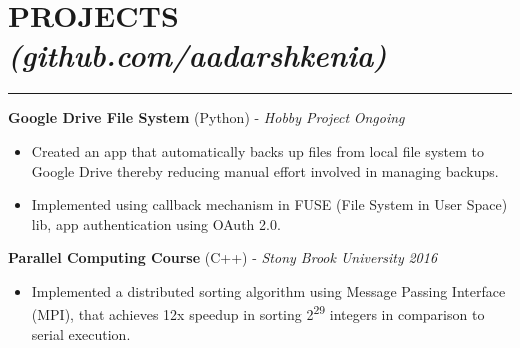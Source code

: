 \documentclass[12pt]{article}
\newcommand{\sectionHeadingWithLink}[2]{
\vspace{-15pt}
\section*{\small{#1 \textit{#2}}}
\vspace{-10pt}
\hrule
\vspace{6pt}
}
\newcommand {\projectSectionSubheadingAlternate}[4]{
    \noindent \small{\textbf{#1} (#3) - \textit{#2} \hfill \textit{#4}} \\
    \vspace{-22pt}
}
\newcommand{\sectionListStart}{
    \begin{itemize}[label={\small{\textbullet}}, leftmargin=20pt] %
}
\newcommand{\sectionListStartWiderSpacing}{
    \begin{itemize}[label={\small{\textbullet}}, leftmargin=20pt, itemsep=-2pt] %
}
\newcommand{\sectionListEnd}{\end{itemize} \vspace{-5pt}}
\newcommand{\sectionListItem}[1]{\item \small{#1}}
\newcommand{\projectNameListItem}[4]{
\item \small{\textbf{#1} \textit{(#2)} : #3  \hfill \textit{#4}}
}
\begin{document}






\sectionHeadingWithLink{PROJECTS}{(github.com/aadarshkenia)}
\projectSectionSubheadingAlternate{Google Drive File System}{Hobby Project}{Python}{Ongoing}
\sectionListStart
    \sectionListItem
        Created an app that automatically backs up files from local file system to Google Drive thereby reducing manual effort involved in managing backups.
    \sectionListItem
        Implemented using callback mechanism in FUSE (File System in User Space) lib, app authentication using OAuth 2.0.
        
\sectionListEnd

\projectSectionSubheadingAlternate{Parallel Computing Course}{Stony Brook University}{C++}{2016}
\sectionListStart
    \sectionListItem
        Implemented a distributed sorting algorithm using Message Passing Interface (MPI), that achieves 12x speedup in sorting 2\textsuperscript{29} integers in comparison to serial execution.
\sectionListEnd
\end{document}

